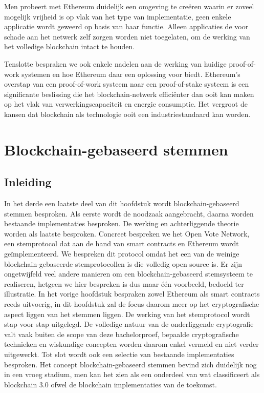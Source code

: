 		 Men probeert met Ethereum duidelijk een omgeving te creëren waarin er zoveel mogelijk vrijheid is op vlak van het type van implementatie, geen enkele applicatie wordt geweerd op basis van haar functie. Alleen applicaties de voor schade aan het netwerk zelf zorgen worden niet toegelaten, om de werking van het volledige blockchain intact te houden. ~\autocite{Buterin2014}
		 
		 Tenslotte bespraken we ook enkele nadelen aan de werking van huidige proof-of-work systemen en hoe  Ethereum daar een oplossing voor biedt. Ethereum's overstap van een proof-of-work systeem naar een proof-of-stake systeem is een significante beslissing die het blockchain-netwerk efficiënter dan ooit kan maken op het vlak van verwerkingscapaciteit en energie consumptie. Het vergroot de kansen dat blockchain  als technologie ooit een industriestandaard kan worden. 
		\newpage
\section{Blockchain-gebaseerd stemmen}
\label{sec:blockchain-gebaseerd-stemmen}
	\subsection*{Inleiding}
			In het derde een laatste deel van dit hoofdstuk wordt blockchain-gebaseerd stemmen besproken.  Als eerste wordt de noodzaak aangebracht, daarna worden bestaande implementaties besproken. De werking en achterliggende theorie worden als laatste besproken. Concreet bespreken we het Open Vote Network, een stemprotocol dat  aan de hand van smart contracts en Ethereum wordt geïmplementeerd. We bespreken dit protocol omdat het een van de weinige blockchain-gebaseerde stemprotocollen is die volledig open source is. Er zijn ongetwijfeld veel andere manieren om een blockchain-gebaseerd stemsysteem te realiseren,  hetgeen we hier bespreken is dus maar één voorbeeld, bedoeld ter illustratie.  In het vorige hoofdstuk bespraken zowel Ethereum als smart contracts reeds uitvoerig, in dit hoofdstuk zal de focus daarom meer op het cryptografische aspect liggen van het stemmen liggen. De werking van het stemprotocol wordt stap voor stap uitgelegd. De volledige natuur van de onderliggende cryptografie valt vaak buiten de scope van deze bachelorproef, bepaalde cryptografische technieken en wiskundige concepten worden daarom enkel vermeld en niet verder uitgewerkt. Tot slot wordt ook een selectie van bestaande implementaties besproken.
			Het concept blockchain-gebaseerd stemmen bevind zich duidelijk nog in een vroeg stadium, men kan het zien als een onderdeel van wat \textcite{Swan2015} classificeert als blockchain 3.0 ofwel de blockchain implementaties van de toekomst.
